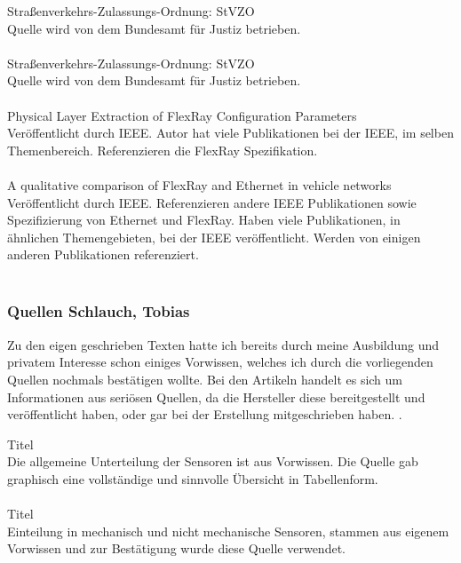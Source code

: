 Stra{\ss}enverkehrs-Zulassungs-Ordnung: StVZO \cite{LA_StVZO38}\\
Quelle wird von dem Bundesamt für Justiz betrieben.\\\\

Stra{\ss}enverkehrs-Zulassungs-Ordnung: StVZO \cite{LA_StVZO41}\\
Quelle wird von dem Bundesamt für Justiz betrieben.\\\\

Physical Layer Extraction of FlexRay Configuration Parameters \cite{LA_FR2}\\
Veröffentlicht durch IEEE. Autor hat viele Publikationen bei der IEEE,
im selben Themenbereich. Referenzieren die FlexRay Spezifikation.\\\\

A qualitative comparison of FlexRay and Ethernet in vehicle networks \cite{LA_FR3}\\
Veröffentlicht durch IEEE. Referenzieren andere IEEE Publikationen sowie
Spezifizierung von Ethernet und FlexRay. Haben viele Publikationen, in ähnlichen
Themengebieten, bei der IEEE veröffentlicht. Werden von einigen anderen Publikationen
referenziert.\\\\

\subsubsection{Quellen Schlauch, Tobias}

Zu den eigen geschrieben Texten hatte ich bereits durch meine Ausbildung und privatem Interesse schon einiges Vorwissen, welches ich durch die vorliegenden Quellen nochmals bestätigen wollte.
Bei den Artikeln handelt es sich um Informationen aus seriösen Quellen, da die Hersteller diese bereitgestellt und veröffentlicht haben, oder gar bei der Erstellung mitgeschrieben haben. .


Titel \cite{TS_sensor_aufteilen}\\
Die allgemeine Unterteilung der Sensoren ist aus Vorwissen. Die Quelle gab graphisch eine vollständige und sinnvolle Übersicht in Tabellenform.\\\\

Titel \cite{TS_sensoren}\\
Einteilung in mechanisch und nicht mechanische Sensoren, stammen aus eigenem Vorwissen und zur Bestätigung wurde diese Quelle verwendet.\\\\

